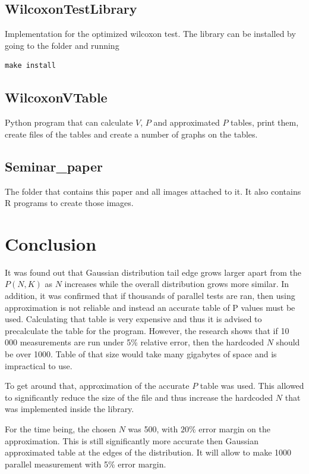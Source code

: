 \documentclass[12pt]{article}
\begin{document}
\subsection{WilcoxonTestLibrary}
Implementation for the optimized wilcoxon test. The library can be installed by going to the folder and running

\begin{lstlisting}
make install
\end{lstlisting}

\subsection{WilcoxonVTable}
Python program that can calculate $V$, $P$ and approximated $P$ tables, print them, create files of the tables and create a number of graphs on the tables.

\subsection{Seminar\_paper}
The folder that contains this paper and all images attached to it. It also contains R programs to create those images.

\newpage

\section{Conclusion}
It was found out that Gaussian distribution tail edge grows larger apart from the $P(N, K)$ as $N$ increases while the overall distribution grows more similar. In addition, it was confirmed that if thousands of parallel tests are ran, then using approximation is not reliable and instead an accurate table of P values must be used. Calculating that table is very expensive and thus it is advised to precalculate the table for the program. However, the research shows that if 10 000 measurements are run under 5\% relative error, then the hardcoded $N$ should be over 1000. Table of that size would take many gigabytes of space and is impractical to use.

To get around that, approximation of the accurate $P$ table was used. This allowed to significantly reduce the size of the file and thus increase the hardcoded $N$ that was implemented inside the library.

For the time being, the chosen $N$ was 500, with $20\%$ error margin on the approximation. This is still significantly more accurate then Gaussian approximated table at the edges of the distribution. It will allow to make 1000 parallel measurement with 5\% error margin.
\end{document}
